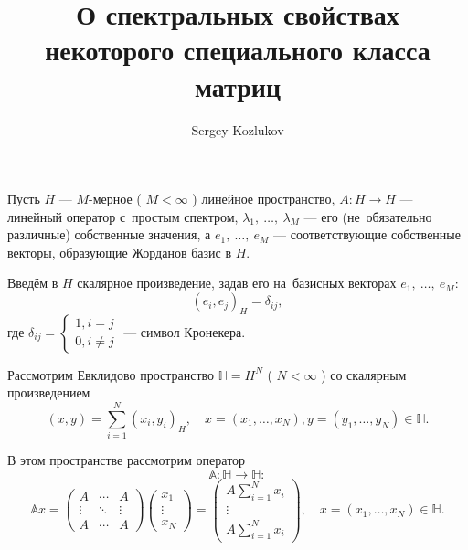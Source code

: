 \documentclass{article}
\title{О спектральных свойствах некоторого специального класса матриц}
\author{Sergey Kozlukov}
\begin{document}
\maketitle

Пусть \( H \) --- \( M \)-мерное ( \( M < \infty \) ) линейное пространство,
\( A: H\to H \) --- линейный оператор с~простым спектром,
\( \lambda_1,~\ldots,~\lambda_M \) --- его (не~обязательно различные)
собственные значения, а \( e_1,~\ldots,~e_M \) --- соответствующие
собственные векторы, образующие Жорданов базис в \( H \).

Введём в \( H \) скалярное произведение, задав его на~базисных векторах
\( e_1,~\ldots,~e_M \):
\[ (e_i,e_j)_H = \delta_{ij}, \]
где \( \delta_{ij} = \left\{\begin{aligned} 1, i=j\\ 0, i\neq j\end{aligned}\right. \) --- символ Кронекера.

Рассмотрим Евклидово пространство \( \mathbb{H}=H^N \) ( \( N < \infty \) )
со скалярным произведением
\[ (x, y) = \sum_{i=1}^N (x_i,y_i)_H, \quad x=(x_1,\ldots,x_N),y=(y_1,\ldots,y_N) \in \mathbb{H}. \] 

В этом пространстве рассмотрим оператор
\[ \mathbb{A}: \mathbb{H}\to \mathbb{H}: \]
\[ \mathbb{A}x =
    \begin{pmatrix}
        A & \cdots & A \\
        \vdots & \ddots & \vdots \\
        A & \cdots & A
    \end{pmatrix}
    \begin{pmatrix}
        x_1 \\
        \vdots \\
        x_N
    \end{pmatrix}
    = \begin{pmatrix}
        A \sum_{i=1}^N x_i \\
        \vdots \\
        A \sum_{i=1}^N x_i
    \end{pmatrix},
    \quad x=(x_1,\ldots,x_N) \in \mathbb{H}. \]
\end{document}
